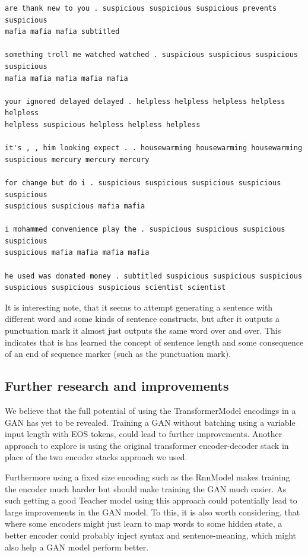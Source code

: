 \documentclass{article}
\begin{document}
\begin{verbatim}
are thank new to you . suspicious suspicious suspicious prevents suspicious
mafia mafia mafia subtitled

something troll me watched watched . suspicious suspicious suspicious suspicious
mafia mafia mafia mafia mafia

your ignored delayed delayed . helpless helpless helpless helpless helpless
helpless suspicious helpless helpless helpless

it's , , him looking expect . . housewarming housewarming housewarming
suspicious mercury mercury mercury

for change but do i . suspicious suspicious suspicious suspicious suspicious
suspicious suspicious mafia mafia

i mohammed convenience play the . suspicious suspicious suspicious suspicious
suspicious mafia mafia mafia mafia

he used was donated money . subtitled suspicious suspicious suspicious
suspicious suspicious suspicious scientist scientist
\end{verbatim}

It is interesting note, that it seems to attempt generating a sentence with
different word and some kinds of sentence constructs, but after it outputs a
punctuation mark it almost just outputs the same word over and over. This
indicates that is has learned the concept of sentence length and some
consequence of an end of sequence marker (such as the punctuation mark).


\subsection{Further research and improvements}\label{sec:furtherResearch}
We believe that the full potential of using the TransformerModel encodings in a
GAN has yet to be revealed. Training a GAN without batching using a variable
input length with EOS tokens, could lead to further improvements. Another
approach to explore is using the original transformer encoder-decoder stack in
place of the two encoder stacks approach we used.

Furthermore using a fixed size encoding such as the RnnModel makes training the
encoder much harder but should make training the GAN much easier. As such
getting a good Teacher model using this approach could potentially lead to large
improvements in the GAN model. To this, it is also worth considering, that where
some encoders might just learn to map words to some hidden state, a better
encoder could probably inject syntax and sentence-meaning, which might also help
a GAN model perform better.
\end{document}

